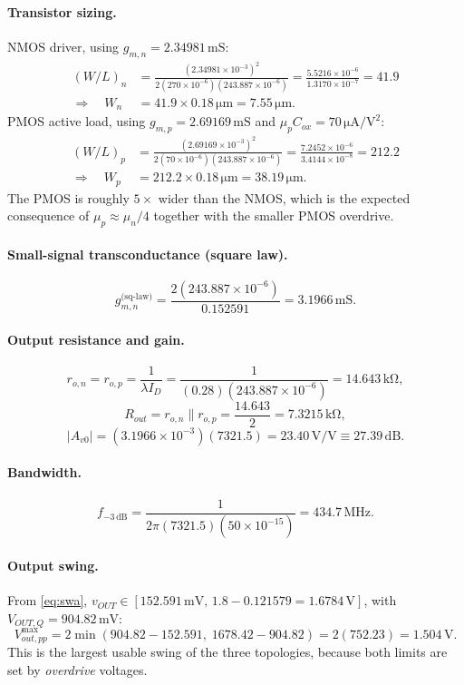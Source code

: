 \documentclass[12pt,a4paper]{article}
\newcommand{\U}[1]{\,\mathrm{#1}}
\newcommand{\WLi}[1]{\left(W/L\right)_{#1}}
\begin{document}
\paragraph{Transistor sizing.}
NMOS driver, using $g_{m,n}=2.34981\U{mS}$:
\begin{align*}
\WLi{n} &= \frac{(2.34981\times10^{-3})^{2}}
                {2(270\times10^{-6})(243.887\times10^{-6})}
         = \frac{5.5216\times10^{-6}}{1.3170\times10^{-7}} = 41.9\\
\Rightarrow\quad W_n &= 41.9\times 0.18\U{\mu m} = 7.55\U{\mu m}.
\end{align*}
PMOS active load, using $g_{m,p}=2.69169\U{mS}$ and
$\mu_p C_{ox}=70\U{\mu A/V^2}$:
\begin{align*}
\WLi{p} &= \frac{(2.69169\times10^{-3})^{2}}
                {2(70\times10^{-6})(243.887\times10^{-6})}
         = \frac{7.2452\times10^{-6}}{3.4144\times10^{-8}} = 212.2\\
\Rightarrow\quad W_p &= 212.2\times 0.18\U{\mu m} = 38.19\U{\mu m}.
\end{align*}
The PMOS is roughly $5\times$ wider than the NMOS, which is the expected
consequence of $\mu_p \approx \mu_n/4$ together with the smaller PMOS
overdrive.

\paragraph{Small-signal transconductance (square law).}
\[
g_{m,n}^{\text{(sq-law)}} = \frac{2(243.887\times10^{-6})}{0.152591}
                          = 3.1966\U{mS}.
\]

\paragraph{Output resistance and gain.}
\[
r_{o,n}=r_{o,p}=\frac{1}{\lambda I_D}
 =\frac{1}{(0.28)(243.887\times10^{-6})} = 14.643\U{k\Omega},
\]
\[
R_{out}=r_{o,n}\parallel r_{o,p} = \frac{14.643}{2} = 7.3215\U{k\Omega},
\]
\[
|A_{v0}| = (3.1966\times10^{-3})(7321.5) = 23.40\U{V/V} \equiv 27.39\U{dB}.
\]

\paragraph{Bandwidth.}
\[
f_{-3\U{dB}} = \frac{1}{2\pi(7321.5)(50\times10^{-15})} = 434.7\U{MHz}.
\]

\paragraph{Output swing.}
From \eqref{eq:swa}, $v_{OUT}\in[152.591\U{mV},\,1.8-0.121579=1.6784\U{V}]$,
with $V_{OUT,Q}=904.82\U{mV}$:
\[
V_{out,pp}^{\max} = 2\min(904.82-152.591,\;1678.42-904.82)
                  = 2(752.23) = 1.504\U{V}.
\]
This is the largest usable swing of the three topologies, because both limits
are set by \emph{overdrive} voltages.
\end{document}
